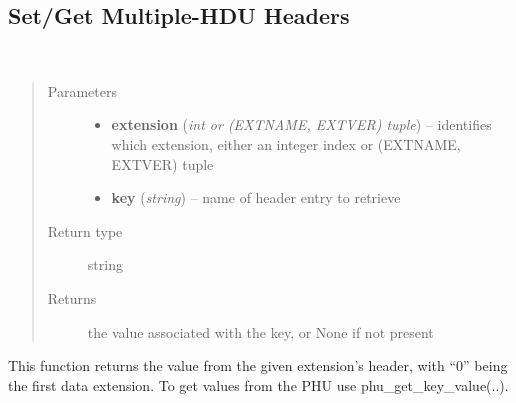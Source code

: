 \documentclass[letterpaper,10pt,english]{sphinxmanual}
\begin{document}
\subsection{Set/Get Multiple-HDU Headers}
\label{chapter_AstroDataClass:set-get-multiple-hdu-headers}

\begin{fulllineitems}
\label{chapter_AstroDataClass:astrodata.data.AstroData.ext_get_key_value}~\begin{quote}\begin{description}
\item[{Parameters}] \leavevmode\begin{itemize}
\item {} 
\textbf{extension} (\emph{int or (EXTNAME, EXTVER) tuple}) -- identifies which extension, either an integer index 
or (EXTNAME, EXTVER) tuple

\item {} 
\textbf{key} (\emph{string}) -- name of header entry to retrieve

\end{itemize}

\item[{Return type}] \leavevmode
string

\item[{Returns}] \leavevmode
the value associated with the key, or None if not present

\end{description}\end{quote}

This function returns the value from the given extension's
header, with ``0'' being the first data extension.  To get
values from the PHU use phu\_get\_key\_value(..).

\end{fulllineitems}


\end{document}
